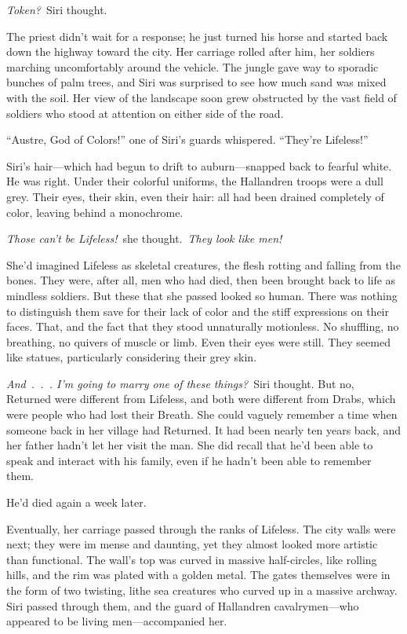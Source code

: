 \textit{Token?}~Siri thought.

The priest didn’t wait for a response; he just turned his horse and started back down the highway toward the city. Her carriage rolled after him, her soldiers marching uncomfortably around the vehicle. The jungle gave way to sporadic bunches of palm trees, and Siri was surprised to see how much sand was mixed with the soil. Her view of the landscape soon grew obstructed by the vast field of soldiers who stood at attention on either side of the road.

“Austre, God of Colors!” one of Siri’s guards whispered. “They’re Lifeless!”

Siri’s hair—which had begun to drift to auburn—snapped back to fearful white. He was right. Under their colorful uniforms, the Hallandren troops were a dull grey. Their eyes, their skin, even their hair: all had been drained completely of color, leaving behind a monochrome.

\textit{Those can’t be Lifeless!}~she thought.~\textit{They look like men!}

She’d imagined Lifeless as skeletal creatures, the flesh rotting and falling from the bones. They were, after all, men who had died, then been brought back to life as mindless soldiers. But these that she passed looked so human. There was nothing to distinguish them save for their lack of color and the stiff expressions on their faces. That, and the fact that they stood unnaturally motionless. No shuffling, no breathing, no quivers of muscle or limb. Even their eyes were still. They seemed like statues, particularly considering their grey skin.

\textit{And~.~.~. I’m going to marry one of these things?}~Siri thought. But no, Returned were different from Lifeless, and both were different from Drabs, which were people who had lost their Breath. She could vaguely remember a time when someone back in her village had Returned. It had been nearly ten years back, and her father hadn’t let her visit the man. She did recall that he’d been able to speak and interact with his family, even if he hadn’t been able to remember them.

He’d died again a week later.

Eventually, her carriage passed through the ranks of Lifeless. The city walls were next; they were im mense and daunting, yet they almost looked more artistic than functional. The wall’s top was curved in massive half-circles, like rolling hills, and the rim was plated with a golden metal. The gates themselves were in the form of two twisting, lithe sea creatures who curved up in a massive archway. Siri passed through them, and the guard of Hallandren cavalrymen—who appeared to be living men—accompanied her.

